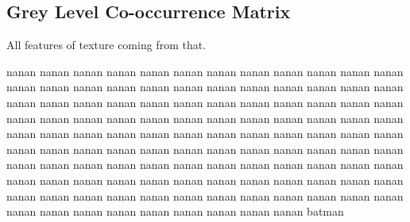 \documentclass[11pt,a4paper]{report}
\begin{document}
\begin{multicols}{2}
\subsection{Grey Level Co-occurrence Matrix}

All features of texture coming from that.

nanan nanan nanan nanan nanan nanan nanan nanan nanan nanan nanan nanan nanan
nanan nanan nanan nanan nanan nanan nanan nanan nanan nanan nanan nanan nanan
nanan nanan nanan nanan nanan nanan nanan nanan nanan nanan nanan nanan nanan
nanan nanan nanan nanan nanan nanan nanan nanan nanan nanan nanan nanan nanan
nanan nanan nanan nanan nanan nanan nanan nanan nanan nanan nanan nanan nanan
nanan nanan nanan nanan nanan nanan nanan nanan nanan nanan nanan nanan nanan
nanan nanan nanan nanan nanan nanan nanan nanan nanan nanan nanan nanan nanan
nanan nanan nanan nanan nanan nanan nanan nanan nanan nanan nanan nanan nanan
nanan nanan nanan nanan nanan nanan nanan nanan nanan nanan nanan nanan nanan
batman


\end{multicols}
\end{document}
